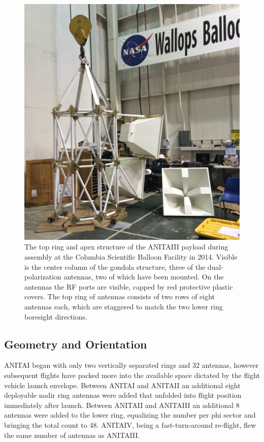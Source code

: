 \begin{figure}
\centering
	\includegraphics[width=\textwidth]{figures/AntennaAssembly}
	\caption{The top ring and apex structure of the ANITAIII payload during assembly at the Columbia Scientific Balloon Facility in 2014.  Visible is the center column of the gondola structure, three of the dual-polarization antennas, two of which have been mounted.  On the antennas the RF ports are visible, capped by red protective plastic covers.  The top ring of antennas consists of two rows of eight antennas each, which are staggered to match the two lower ring boresight directions.}
	\label{fig:antennaAssembly}
\end{figure}	
	
	\subsection{Geometry and Orientation}
	ANITAI began with only two vertically separated rings and 32 antennas, however subsequent flights have packed more into the available space dictated by the flight vehicle launch envelope.  Between ANITAI and ANITAII an additional eight deployable nadir ring antennas were added that unfolded into flight position immediately after launch.  Between ANITAII and ANITAIII an additional 8 antennas were added to the lower ring, equalizing the number per phi sector and bringing the total count to 48.  ANITAIV, being a fast-turn-around re-flight, flew the same number of antennas as ANITAIII.  
	
